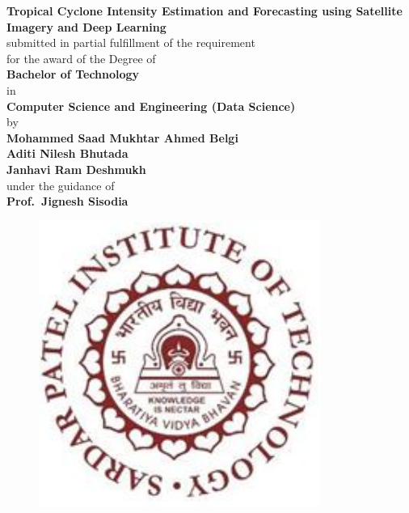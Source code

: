 \begin{titlepage}
\vspace*{0.25cm}
{\centering
\large
{\Large\textbf {Tropical Cyclone Intensity Estimation and Forecasting using Satellite Imagery and Deep Learning}}\\
\vspace{0.75cm}
submitted in partial fulfillment of the requirement\\
for the award of the Degree of\\\vspace{1cm}
{\large\textbf {Bachelor of Technology}}\\
in \\
{\large \textbf {Computer Science and Engineering (Data Science)}}\\
\vspace{0.75cm}
by\\
\vspace{0.75cm}
{\large \textbf {Mohammed Saad Mukhtar Ahmed Belgi}}\\
{\large \textbf {Aditi Nilesh Bhutada}}\\
{\large \textbf {Janhavi Ram Deshmukh}}\\
\vspace{0.75cm} 
under the guidance of\\ 
\vspace{0.75cm}
\hspace{.05cm} {\large \textbf {Prof.\ Jignesh Sisodia}}\\
\begin{figure}[h]
\centering
\includegraphics[scale=0.8]{spitlogo.pdf}

\end{figure}}
\end{titlepage}
